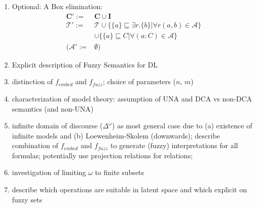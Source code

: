 \documentclass[]{article}
\begin{document}
\begin{enumerate}
	\item Optional: A Box elimination:
	\begin{align*}
		\mathbf{C'}:=& \mathbf{C} \cup \mathbf{I}\\
		\mathcal{T}':=& \mathcal{T} \cup\{\{a\}\sqsubseteq\exists r.\{b\}|\forall r(a,b)\in \mathcal{A}\}\\
		&\cup \{\{a\}\sqsubseteq C| \forall (a:C)\in\mathcal{A}\}\\
		(\mathcal{A}':=&\emptyset)
	\end{align*}

        \item Explicit description of Fuzzy Semantics for DL
        \item distinction of $f_{embed}$ and $f_{fuzz}$; choice of
          parameters ($n$, $m$)
        \item characterization of model theory: assumption of UNA and
          DCA vs non-DCA semantics (and non-UNA)
        \item infinite domain of discourse ($\Delta^\omega$) as most
          general case due to (a) existence of infinite models and (b)
          Loewenheim-Skolem (downwards); describe combination of
          $f_{embed}$ and $f_{fuzz}$ to generate (fuzzy)
          interpretations for all formulas; potentially use projection
          relations for relations;
        \item investigation of limiting $\omega$ to finite subsets
        \item describe which operations are suitable in latent space
          and which explicit on fuzzy sets
        


\end{enumerate}
\end{document}
